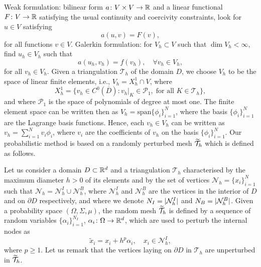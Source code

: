 \documentclass[10pt]{article}
\begin{document}
Weak formulation: bilinear form $a\colon V\times V \to \mathbb{R}$ and a linear functional $F\colon V \to \mathbb{R}$ satisfying the usual continuity and coercivity constraints, look for $u \in V$ satisfying
\begin{equation}\label{eq:EXSol}
	a(u, v) = F(v),	
\end{equation}
for all functions $v \in V$. Galerkin formulation: for $V_h \subset V$ such that $\dim V_h < \infty$, find $u_h \in V_h$ such that
\begin{equation}\label{eq:FEMSol}
	a(u_h, v_h) = f(v_h), \quad \forall v_h \in V_h,
\end{equation}
for all $v_h \in V_h$. Given a triangulation $\mathcal T_h$ of the domain $D$, we choose $V_h$ to be the space of linear finite elements, i.e., $V_h = X_h^1 \cap V$, where 
\begin{equation}
	X_h^1 = \{v_h \in C^0(\overline D) \colon v_h|_{K} \in \mathcal P_1, \; \text{for all } K \in \mathcal T_h\},
\end{equation}
and where $\mathcal P_1$ is the space of polynomials of degree at most one. The finite element space can be written then as $V_h = \mathrm{span}\{\phi_i\}_{i=1}^N$, where the basis $\{\phi_i\}_{i=1}^N$ are the Lagrange basis functions. Hence, each $v_h \in V_h$ can be written as $v_h = \sum_{i=1}^N v_i \phi_i$, where $v_i$ are the coefficients of $v_h$ on the basis $\{\phi_i\}_{i=1}^N$. Our probabilistic method is based on a randomly perturbed mesh $\widetilde {\mathcal T}_h$ which is defined as follows.

\begin{definition} \label{def:RandomMesh} Let us consider a domain $D \subset \mathbb{R}^d$ and a triangulation $\mathcal T_h$ characterised by the maximum diameter $h > 0$ of its elements and by the set of vertices $\mathcal N_h = \{x_i\}_{i=1}^{N}$ such that $\mathcal N_h = \mathcal N_h^I \cup \mathcal N_h^B$, where $\mathcal N_h^I$ and $\mathcal N_h^B$ are the vertices in the interior of $D$ and on $\partial D$ respectively, and where we denote $N_I = \lvert\mathcal N_h^I\rvert$ and $N_B = \lvert\mathcal N_h^B\rvert$. Given a probability space $(\Omega, \Sigma, \mu)$, the random mesh $\widetilde {\mathcal T}_h$ is defined by a sequence of random variables $\{\alpha_i\}_{i=1}^{N_I}$, $\alpha_i \colon \Omega \to \mathbb{R}^d$, which are used to perturb the internal nodes as
	\begin{equation}
		\tilde x_i = x_i + h^p \alpha_i, \quad x_i \in \mathcal N_h^I,
	\end{equation}
	where $p \geq 1$. Let us remark that the vertices laying on $\partial D$ in $\mathcal T_h$ are unperturbed in $\widetilde {\mathcal T}_h$.
\end{definition}
\end{document}

